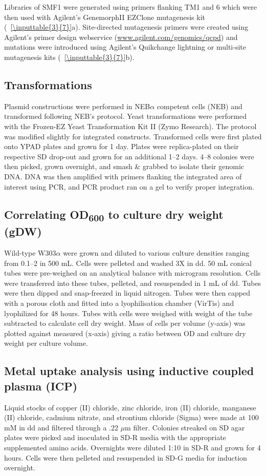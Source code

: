 \documentclass[../main/main]{subfiles}
\begin{document}
Libraries of SMF1 were generated using primers flanking TM1 and 6 which were then used with Agilent's GenemorphII EZClone mutagenesis kit (\sTABLE~\ref{\inputtable{3}{7}}a). Site-directed mutagenesis primers were created using Agilent's primer design webservice (\url{www.agilent.com/genomics/qcpd}) and mutations were introduced using Agilent's Quikchange lightning or multi-site mutagenesis kits (\sTABLE~\ref{\inputtable{3}{7}}b).

\subsection*{Transformations}
Plasmid constructions were performed in NEB$\alpha$ competent cells (NEB) and transformed following NEB's protocol. Yeast transformations were performed with the Frozen-EZ Yeast Transformation Kit II (Zymo Research). The protocol was modified slightly for integrated constructs. Transformed cells were first plated onto YPAD plates and grown for 1 day. Plates were replica-plated on their respective SD drop-out and grown for an additional 1--2 days. 4--8 colonies were then picked, grown overnight, and smash \& grabbed to isolate their genomic DNA. DNA was then amplified with primers flanking the integrated area of interest using PCR, and PCR product ran on a gel to verify proper integration.

\subsection*{Correlating OD\textsubscript{600} to culture dry weight (gDW)}
Wild-type W303$\alpha$ were grown and diluted to various culture densities ranging from 0.1--2 \OD{} in 500 mL. Cells were pelleted and washed 3X in dd. 50 mL conical tubes were pre-weighed on an analytical balance with microgram resolution. Cells were transferred into these tubes, pelleted, and resuspended in 1 mL of dd. Tubes were then dipped and snap-freezed in liquid nitrogen. Tubes were then capped with a porous cloth and fitted into a lyophilisation chamber (VirTis) and lyophilized for 48 hours. Tubes with cells were weighed with weight of the tube subtracted to calculate cell dry weight. Mass of cells per volume (y-axis) was plotted against measured \OD{} (x-axis) giving a ratio between OD and culture dry weight per culture volume.

\subsection*{Metal uptake analysis using inductive coupled plasma (ICP)}
Liquid stocks of copper (II) chloride, zinc chloride, iron (II) chloride, manganese (II) chloride, cadmium nitrate, and strontium chloride (Sigma) were made at 100 mM in dd and filtered through a .22 $\mu$m filter. Colonies streaked on SD agar plates were picked and inoculated in SD-R media with the appropriate supplemented amino acids. Overnights were diluted 1:10 in SD-R and grown for 4 hours. Cells were then pelleted and resuspended in SD-G media for induction overnight.
\end{document}
